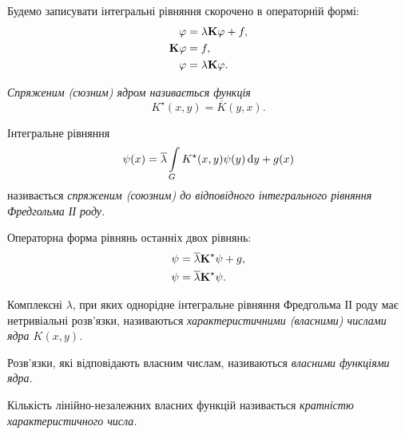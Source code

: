 \begin{remark}
    Будемо записувати інтегральні рівняння скорочено в операторній формі:
    \begin{align}
    	\phi &= \lambda \bf{K} \phi + f, \\
    	\bf{K} \phi &= f, \\
    	\phi &= \lambda \bf{K} \phi.
    \end{align}
\end{remark}

\begin{definition}
	\it{Спряженим (сюзним) ядром} називається функція
	\begin{equation}
		K^\star (x, y) = \overline{K}(y, x).
	\end{equation}
\end{definition}

\begin{definition}
	Інтегральне рівняння
	\begin{equation}
		\psi(x) = \overline \lambda \Int_G K^\star (x, y) \psi(y) \diff y + g(x)
	\end{equation}
	називається \it{спряженим (союзним)} до відповідного інтегрального рівняння Фредгольма ІІ роду.
\end{definition}

\begin{remark}
    Операторна форма рівнянь останніх двох рівнянь:
    \begin{align}
    	\psi &= \overline \lambda \bf{K}^\star \psi + g, \\
    	\psi &= \overline \lambda \bf{K}^\star \psi.
    \end{align}
\end{remark}

\begin{definition}
	Комплексні $\lambda$, при яких однорідне інтегральне рівняння Фредгольма ІІ роду має нетривіальні розв'язки, називаються \it{характеристичними (власними) числами} ядра $K(x, y)$.
\end{definition}

\begin{definition}
	Розв'язки, які відповідають власним числам, називаються \it{власними функціями} ядра.
\end{definition}

\begin{definition}
	Кількість лі\-ній\-но-незалежних власних функцій називається \it{кратністю характеристичного числа}.
\end{definition}


